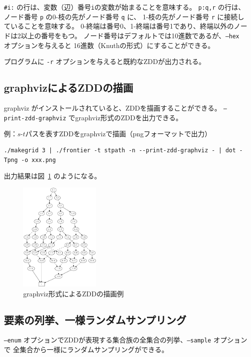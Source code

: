 \documentclass{jsarticle}
\begin{document}
\texttt{\#i:} の行は、変数（辺）番号\texttt{i}の変数が始まることを意味する。
\texttt{p:q,r} の行は、ノード番号 \texttt{p} の0-枝の先がノード番号 \texttt{q} に、
1-枝の先がノード番号 \texttt{r} に接続していることを意味する。
0-終端は番号0、1-終端は番号1であり、終端以外のノードは2以上の番号をもつ。
ノード番号はデフォルトでは10進数であるが、\texttt{--hex} オプションを与えると
16進数（Knuthの形式）にすることができる。

プログラムに \texttt{-r} オプションを与えると既約なZDDが出力される。

\subsection{graphvizによるZDDの描画}

graphviz がインストールされていると、ZDDを描画することができる。
\texttt{--print-zdd-graphviz} でgraphviz形式のZDDを出力できる。

例：$s$-$t$パスを表すZDDをgraphvizで描画（pngフォーマットで出力）

\begin{verbatim}
./makegrid 3 | ./frontier -t stpath -n --print-zdd-graphviz - | dot -Tpng -o xxx.png
\end{verbatim}

出力結果は図~\ref{fig:zdd_example} のようになる。

\begin{figure}[h]
  \begin{center}
    \includegraphics[width=40mm]{zdd_example.eps}
  \end{center}
  \caption{graphviz形式によるZDDの描画例}
  \label{fig:zdd_example}
\end{figure}

\subsection{要素の列挙、一様ランダムサンプリング}

\texttt{--enum} オプションでZDDが表現する集合族の全集合の列挙、\texttt{--sample} オプションで
全集合から一様にランダムサンプリングができる。
\end{document}

